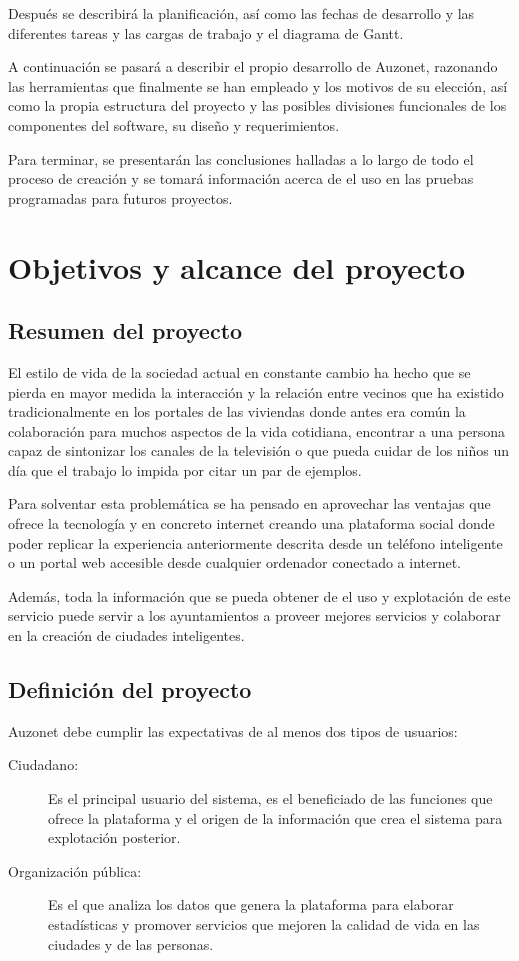 \documentclass{DeustoFDP}
\begin{document}
Después se describirá la planificación, así como las fechas de desarrollo y las diferentes tareas y las cargas de trabajo y el diagrama de Gantt.

A continuación se pasará a describir el propio desarrollo de Auzonet, razonando las herramientas que finalmente se han empleado y los motivos de su elección, así como la propia estructura del proyecto y las posibles divisiones funcionales de los componentes del software, su diseño y requerimientos.


Para terminar, se presentarán las conclusiones halladas a lo largo de todo el proceso de creación y se tomará información acerca de el uso en las pruebas programadas para futuros proyectos.

\chapter{Objetivos y alcance del proyecto}\label{cha:objetivosyalcance}
\section{Resumen del proyecto}
El estilo de vida de la sociedad actual en constante cambio ha hecho que se pierda en mayor medida la interacción y la relación entre vecinos que ha existido tradicionalmente en los portales de las viviendas donde antes era común la colaboración para muchos aspectos de la vida cotidiana, encontrar a una persona capaz de sintonizar los canales de la televisión o que pueda cuidar de los niños un día que el trabajo lo impida por citar un par de ejemplos.

Para solventar esta problemática se ha pensado en aprovechar las ventajas que ofrece la tecnología y en concreto internet creando una plataforma social donde poder replicar la experiencia anteriormente descrita desde un teléfono inteligente o un portal web accesible desde cualquier ordenador conectado a internet.

Además, toda la información que se pueda obtener de el uso y explotación de este servicio puede servir a los ayuntamientos a proveer mejores servicios y colaborar en la creación de ciudades inteligentes.

\section{Definición del proyecto}
Auzonet debe cumplir las expectativas de al menos dos tipos de usuarios:
\begin{description}
  \item[Ciudadano:] Es el principal usuario del sistema, es el beneficiado de las funciones que ofrece la plataforma y el origen de la información que crea el sistema para explotación posterior.
  \item[Organización pública:] Es el que analiza los datos que genera la plataforma para elaborar estadísticas y promover servicios que mejoren la calidad de vida en las ciudades y de las personas.
\end{description}
\end{document}
